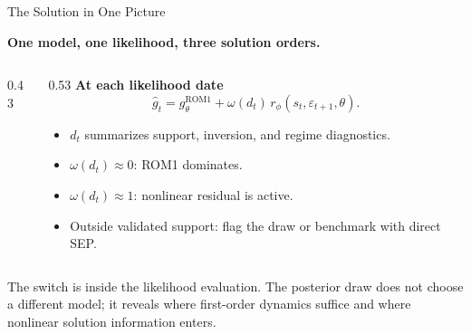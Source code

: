 \documentclass[aspectratio=169,10pt]{beamer}
\newcommand{\rom}{\mathrm{ROM1}}
\newcommand{\eps}{\varepsilon}
\newcommand{\state}{s}
\newcommand{\smallnote}[1]{%
  \vspace{0.25em}
  \begin{center}
  \parbox{0.92\linewidth}{\centering\footnotesize #1}
  \end{center}
}
\newcommand{\claim}[1]{%
  \begin{center}
  \parbox{0.94\linewidth}{\centering\large\bfseries #1}
  \end{center}
}
\begin{document}
\begin{frame}{The Solution in One Picture}
\claim{One model, one likelihood, three solution orders.}

\vspace{0.2em}
\begin{columns}[T,onlytextwidth]
\begin{column}{0.43\textwidth}
\centering
{}
\end{column}
\begin{column}{0.53\textwidth}
\textbf{At each likelihood date}
\[
  \widehat g_t
  =
  g^{\rom}_{\theta}
  +
  \omega(d_t)\,r_{\phi}(\state_t,\eps_{t+1},\theta).
\]

\vspace{-0.4em}
\begin{itemize}
  \item \(d_t\) summarizes support, inversion, and regime diagnostics.
  \item \(\omega(d_t)\approx0\): ROM1 dominates.
  \item \(\omega(d_t)\approx1\): nonlinear residual is active.
  \item Outside validated support: flag the draw or benchmark with direct SEP.
\end{itemize}
\end{column}
\end{columns}

\smallnote{The switch is inside the likelihood evaluation. The posterior draw does not choose a different model; it reveals where first-order dynamics suffice and where nonlinear solution information enters.}
\end{frame}
\end{document}
